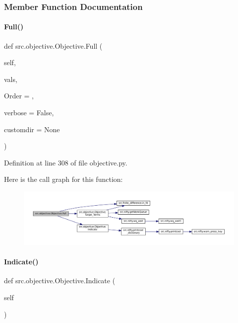 \subsubsection{Member Function Documentation}
\mbox{\label{classsrc_1_1objective_1_1Objective_a187f9fbe63483e6aa6bbf5c546d983e5}} 
\paragraph{\texorpdfstring{Full()}{Full()}}
{\footnotesize\ttfamily def src.\+objective.\+Objective.\+Full (\begin{DoxyParamCaption}\item[{}]{self,  }\item[{}]{vals,  }\item[{}]{Order = {},  }\item[{}]{verbose = {\ttfamily False},  }\item[{}]{customdir = {\ttfamily None} }\end{DoxyParamCaption})}



Definition at line 308 of file objective.\+py.

Here is the call graph for this function\+:
\nopagebreak
\begin{figure}[H]
\begin{center}
\leavevmode
\includegraphics[width=350pt]{classsrc_1_1objective_1_1Objective_a187f9fbe63483e6aa6bbf5c546d983e5_cgraph}
\end{center}
\end{figure}
\mbox{\label{classsrc_1_1objective_1_1Objective_a18701bc88cb55e89b195a2dba2e6fca2}} 
\paragraph{\texorpdfstring{Indicate()}{Indicate()}}
{\footnotesize\ttfamily def src.\+objective.\+Objective.\+Indicate (\begin{DoxyParamCaption}\item[{}]{self }\end{DoxyParamCaption})}



